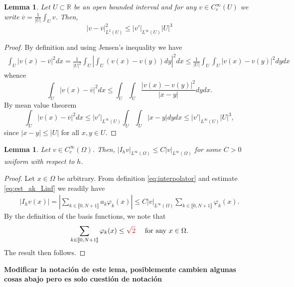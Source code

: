 \documentclass[11 pt]{article}
\newcommand\blue[1]{{\color{blue}\textbf{#1}}}
\newcommand\inter[1]{\llbracket #1\rrbracket}
\newtheorem{lemma}[theorem]{Lemma}
\numberwithin{equation}{section}
\def\R{\mathbb{R}}
\newcommand{\B}[1]{{\color{red} #1}}  %
\begin{document}
\begin{lemma}\label{lem:poincare_type}
Let $U\subset \R$ be an open bounded interval and for any $v\in C_c^\infty(U)$ we write $\overline v=\frac{1}{|U|}\int_{U}v$. Then,
%
\begin{equation}
    |v-\overline{v}|_{L^2(U)}^2\leq |v'|_{L^\infty(U)}|U|^3
\end{equation}
%
\end{lemma}
%
\begin{proof}
By definition and using Jensen's inequality we have
%
\begin{align}
    \int_{U}|v(x)-\overline{v}|^2dx=\frac{1}{|U|^2}\int_{U}\left|\int_{U}(v(x)-v(y))dy\right|^2dx \leq \frac{1}{|U|}\int_{U}\int_{U}|v(x)-v(y)|^2dy dx
\end{align}
%
whence
%
\begin{equation}
    \int_{U}|v(x)-\overline{v}|^2dx \leq \int_{U}\int_{U}\frac{|v(x)-v(y)|^2}{|x-y|}dy dx.
\end{equation}
%
By mean value theorem
%
\begin{equation}
    \int_{U}|v(x)-\overline{v}|^2dx 
    \leq |v'|_{L^\infty(U)}\int_{U}\int_{U}|x-y|dy dx
    \leq |v'|_{L^\infty(U)}|U|^3,
\end{equation}
%
since $|x-y|\leq |U|$ for all $x,y\in U$.
\end{proof}

\begin{lemma}\label{lem:inter_l_infty}
    Let $v\in C_c^\infty(\Omega)$. Then, $|I_h v|_{L^\infty(\Omega)}\leq C|v|_{L^\infty(\Omega)}$ for some $C>0$ uniform with respect to $h$.
\end{lemma}
%
\begin{proof}
Let $x\in \Omega$ be arbitrary. From definition \eqref{eq:interpolator} and estimate \eqref{eq:est_ak_Linf} we readily have
%
\begin{align*}
    |I_h v(x)|=\left|\sum_{k\in\inter{0,N+1}}a_k \varphi_k(x)\right| \leq C|v|_{L^\infty(\Omega)}\sum_{k\in\inter{0,N+1}}\varphi_k(x).
\end{align*}
%
By the definition of the basis functions, we note that 
%
\begin{equation*}
    \sum_{k\in\inter{0,N+1}}\varphi_k(x)\leq \B{\sqrt{2}} \quad \textnormal{ for any $x\in\Omega$}.
\end{equation*}
The result then follows. 
\end{proof}

\blue{Modificar la notación de este lema, posiblemente cambien algunas cosas abajo pero es solo cuestión de notación}
\end{document}
